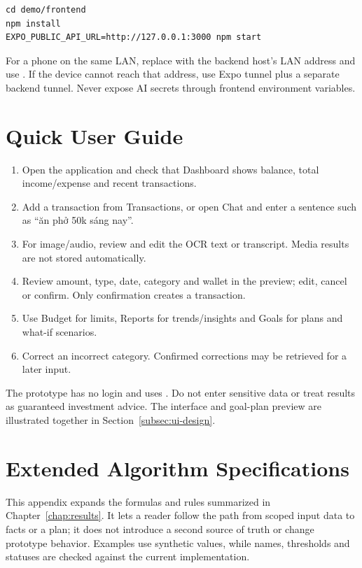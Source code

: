 \begin{verbatim}
cd demo/frontend
npm install
EXPO_PUBLIC_API_URL=http://127.0.0.1:3000 npm start
\end{verbatim}

For a phone on the same LAN, replace  with the backend host's LAN address and use . If the device cannot reach that address, use Expo tunnel plus a separate backend tunnel. Never expose AI secrets through frontend environment variables.

\chapter{Quick User Guide}

\begin{enumerate}
  \item Open the application and check that Dashboard shows balance, total income/expense and recent transactions.
  \item Add a transaction from Transactions, or open Chat and enter a sentence such as ``ăn phở 50k sáng nay''.
  \item For image/audio, review and edit the OCR text or transcript. Media results are not stored automatically.
  \item Review amount, type, date, category and wallet in the preview; edit, cancel or confirm. Only confirmation creates a transaction.
  \item Use Budget for limits, Reports for trends/insights and Goals for plans and what-if scenarios.
  \item Correct an incorrect category. Confirmed corrections may be retrieved for a later input.
\end{enumerate}

The prototype has no login and uses . Do not enter sensitive data or treat results as guaranteed investment advice. The interface and goal-plan preview are illustrated together in Section~\ref{subsec:ui-design}.



\chapter{Extended Algorithm Specifications}
\label{app:algorithms}

This appendix expands the formulas and rules summarized in Chapter~\ref{chap:results}. It lets a reader follow the path from scoped input data to facts or a plan; it does not introduce a second source of truth or change prototype behavior. Examples use synthetic values, while names, thresholds and statuses are checked against the current implementation.

